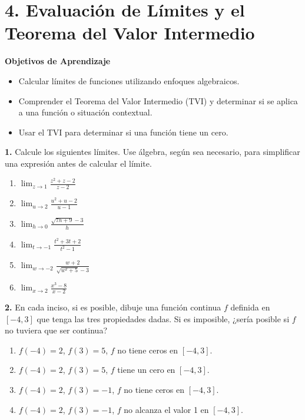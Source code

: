 \documentclass{article}
\begin{document}
\section*{4. Evaluación de Límites y el Teorema del Valor Intermedio}

\textbf{Objetivos de Aprendizaje}
\begin{itemize}
    \item Calcular límites de funciones utilizando enfoques algebraicos.
    \item Comprender el Teorema del Valor Intermedio (TVI) y determinar si se aplica a una función o situación contextual.
    \item Usar el TVI para determinar si una función tiene un cero.
\end{itemize}

\noindent \textbf{1.} Calcule los siguientes límites. Use álgebra, según sea necesario, para simplificar una expresión antes de calcular el límite.
\begin{enumerate}[label=(\alph*)]
    \item $\lim_{z\to1}\frac{z^2+z-2}{z-2}$
    \item $\lim_{u\to2}\frac{u^2+u-2}{u-1}$
    \item $\lim_{h\to0}\frac{\sqrt{7h+9}-3}{h}$
    \item $\lim_{t\to-1}\frac{t^2+3t+2}{t^2-1}$
    \item $\lim_{w\to-2}\frac{w+2}{\sqrt{w^2+5}-3}$
    \item $\lim_{x\to2}\frac{x^3-8}{x-2}$
\end{enumerate}

\vspace{0.5cm}

\noindent \textbf{2.} En cada inciso, si es posible, dibuje una función continua $f$ definida en $[-4, 3]$ que tenga las tres propiedades dadas. Si es imposible, ¿sería posible si $f$ no tuviera que ser continua?
\begin{enumerate}[label=(\alph*)]
    \item $f(-4)=2$, $f(3)=5$, $f$ no tiene ceros en $[-4,3]$.
    \item $f(-4)=2$, $f(3)=5$, $f$ tiene un cero en $[-4,3]$.
    \item $f(-4)=2$, $f(3)=-1$, $f$ no tiene ceros en $[-4,3]$.
    \item $f(-4)=2$, $f(3)=-1$, $f$ no alcanza el valor 1 en $[-4,3]$.
\end{enumerate}

\vspace{0.5cm}
\end{document}
